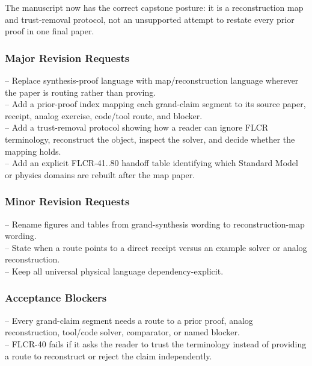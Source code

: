 \documentclass[11pt]{article}
\begin{document}
The manuscript now has the correct capstone posture: it is a reconstruction map and trust-removal protocol, not an unsupported attempt to restate every prior proof in one final paper.

\subsubsection*{Major Revision Requests}

\noindent{}-- Replace synthesis-proof language with map/reconstruction language wherever the paper is routing rather than proving.\\
\noindent{}-- Add a prior-proof index mapping each grand-claim segment to its source paper, receipt, analog exercise, code/tool route, and blocker.\\
\noindent{}-- Add a trust-removal protocol showing how a reader can ignore FLCR terminology, reconstruct the object, inspect the solver, and decide whether the mapping holds.\\
\noindent{}-- Add an explicit FLCR-41..80 handoff table identifying which Standard Model or physics domains are rebuilt after the map paper.\\

\subsubsection*{Minor Revision Requests}

\noindent{}-- Rename figures and tables from grand-synthesis wording to reconstruction-map wording.\\
\noindent{}-- State when a route points to a direct receipt versus an example solver or analog reconstruction.\\
\noindent{}-- Keep all universal physical language dependency-explicit.\\

\subsubsection*{Acceptance Blockers}

\noindent{}-- Every grand-claim segment needs a route to a prior proof, analog reconstruction, tool/code solver, comparator, or named blocker.\\
\noindent{}-- FLCR-40 fails if it asks the reader to trust the terminology instead of providing a route to reconstruct or reject the claim independently.\\
\end{document}
